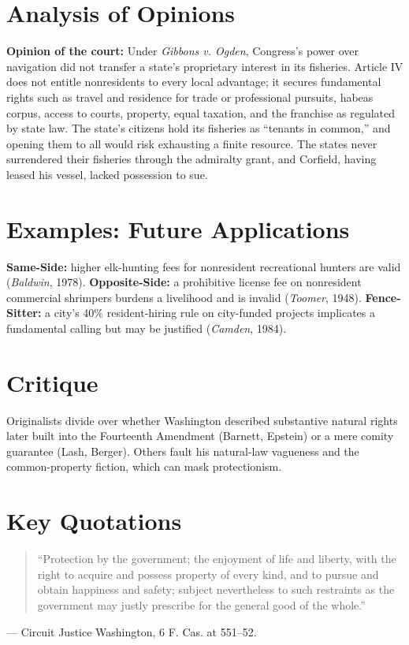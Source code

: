 \documentclass[12pt]{article}
\begin{document}
\section{Analysis of Opinions}
\textbf{Opinion of the court:} Under \textit{Gibbons v. Ogden}, Congress's power over navigation did not transfer a state's proprietary interest in its fisheries. Article IV does not entitle nonresidents to every local advantage; it secures fundamental rights such as travel and residence for trade or professional pursuits, habeas corpus, access to courts, property, equal taxation, and the franchise as regulated by state law. The state's citizens hold its fisheries as ``tenants in common,'' and opening them to all would risk exhausting a finite resource. The states never surrendered their fisheries through the admiralty grant, and Corfield, having leased his vessel, lacked possession to sue.

\section{Examples: Future Applications}
\textbf{Same-Side:} higher elk-hunting fees for nonresident recreational hunters are valid (\textit{Baldwin}, 1978). \textbf{Opposite-Side:} a prohibitive license fee on nonresident commercial shrimpers burdens a livelihood and is invalid (\textit{Toomer}, 1948). \textbf{Fence-Sitter:} a city's 40\% resident-hiring rule on city-funded projects implicates a fundamental calling but may be justified (\textit{Camden}, 1984).

\section{Critique}
Originalists divide over whether Washington described substantive natural rights later built into the Fourteenth Amendment (Barnett, Epstein) or a mere comity guarantee (Lash, Berger). Others fault his natural-law vagueness and the common-property fiction, which can mask protectionism.

\section{Key Quotations}
\begin{quote}
``Protection by the government; the enjoyment of life and liberty, with the right to acquire and possess property of every kind, and to pursue and obtain happiness and safety; subject nevertheless to such restraints as the government may justly prescribe for the general good of the whole.''
\end{quote}
\noindent --- Circuit Justice Washington, 6 F. Cas. at 551--52.
\end{document}
